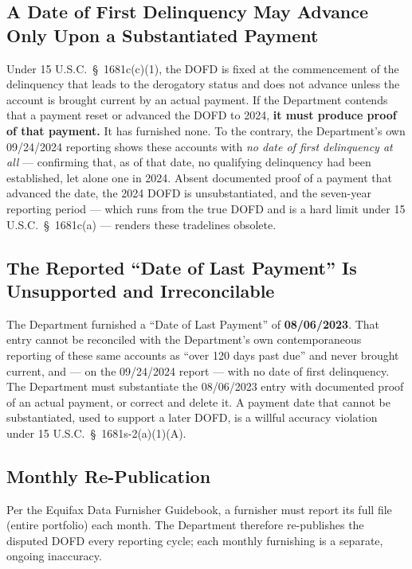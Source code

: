 \documentclass[12pt,letterpaper]{article}
\begin{document}
\subsection*{A Date of First Delinquency May Advance Only Upon a Substantiated Payment}

Under 15 U.S.C.\ \S~1681c(c)(1), the DOFD is fixed at the commencement of the delinquency that leads to the derogatory status and does not advance unless the account is brought current by an actual payment. If the Department contends that a payment reset or advanced the DOFD to 2024, \textbf{it must produce proof of that payment.} It has furnished none. To the contrary, the Department's own 09/24/2024 reporting shows these accounts with \emph{no date of first delinquency at all} --- confirming that, as of that date, no qualifying delinquency had been established, let alone one in 2024. Absent documented proof of a payment that advanced the date, the 2024 DOFD is unsubstantiated, and the seven-year reporting period --- which runs from the true DOFD and is a hard limit under 15 U.S.C.\ \S~1681c(a) --- renders these tradelines obsolete.

\subsection*{The Reported ``Date of Last Payment'' Is Unsupported and Irreconcilable}

The Department furnished a ``Date of Last Payment'' of \textbf{08/06/2023}. That entry cannot be reconciled with the Department's own contemporaneous reporting of these same accounts as ``over 120 days past due'' and never brought current, and --- on the 09/24/2024 report --- with no date of first delinquency. The Department must substantiate the 08/06/2023 entry with documented proof of an actual payment, or correct and delete it. A payment date that cannot be substantiated, used to support a later DOFD, is a willful accuracy violation under 15 U.S.C.\ \S~1681s-2(a)(1)(A).

\subsection*{Monthly Re-Publication}

Per the Equifax Data Furnisher Guidebook, a furnisher must report its full file (entire portfolio) each month. The Department therefore re-publishes the disputed DOFD every reporting cycle; each monthly furnishing is a separate, ongoing inaccuracy.
\end{document}
